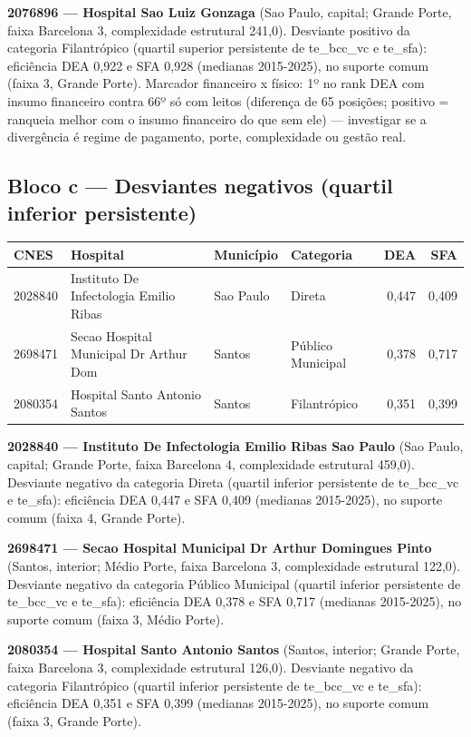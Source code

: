 \documentclass[12pt,a4paper]{article}
\begin{document}
\noindent\textbf{2076896 --- Hospital Sao Luiz Gonzaga} (Sao Paulo, capital; Grande Porte, faixa Barcelona 3, complexidade estrutural 241,0). Desviante positivo da categoria Filantrópico (quartil superior persistente de te\_bcc\_vc e te\_sfa): eficiência DEA 0,922 e SFA 0,928 (medianas 2015-2025), no suporte comum (faixa 3, Grande Porte). Marcador financeiro x físico: 1º no rank DEA com insumo financeiro contra 66º só com leitos (diferença de 65 posições; positivo = ranqueia melhor com o insumo financeiro do que sem ele) — investigar se a divergência é regime de pagamento, porte, complexidade ou gestão real.\par\medskip

\subsection{Bloco c --- Desviantes negativos (quartil inferior persistente)}
\begin{center}\small
\begin{tabular}{llllrr}
\toprule
CNES & Hospital & Município & Categoria & DEA & SFA \\
\midrule
2028840 & Instituto De Infectologia Emilio Ribas & Sao Paulo & Direta & 0,447 & 0,409 \\
2698471 & Secao Hospital Municipal Dr Arthur Dom & Santos & Público Municipal & 0,378 & 0,717 \\
2080354 & Hospital Santo Antonio Santos & Santos & Filantrópico & 0,351 & 0,399 \\
\bottomrule
\end{tabular}
\end{center}
\noindent\textbf{2028840 --- Instituto De Infectologia Emilio Ribas Sao Paulo} (Sao Paulo, capital; Grande Porte, faixa Barcelona 4, complexidade estrutural 459,0). Desviante negativo da categoria Direta (quartil inferior persistente de te\_bcc\_vc e te\_sfa): eficiência DEA 0,447 e SFA 0,409 (medianas 2015-2025), no suporte comum (faixa 4, Grande Porte).\par\medskip
\noindent\textbf{2698471 --- Secao Hospital Municipal Dr Arthur Domingues Pinto} (Santos, interior; Médio Porte, faixa Barcelona 3, complexidade estrutural 122,0). Desviante negativo da categoria Público Municipal (quartil inferior persistente de te\_bcc\_vc e te\_sfa): eficiência DEA 0,378 e SFA 0,717 (medianas 2015-2025), no suporte comum (faixa 3, Médio Porte).\par\medskip
\noindent\textbf{2080354 --- Hospital Santo Antonio Santos} (Santos, interior; Grande Porte, faixa Barcelona 3, complexidade estrutural 126,0). Desviante negativo da categoria Filantrópico (quartil inferior persistente de te\_bcc\_vc e te\_sfa): eficiência DEA 0,351 e SFA 0,399 (medianas 2015-2025), no suporte comum (faixa 3, Grande Porte).\par\medskip
\end{document}
